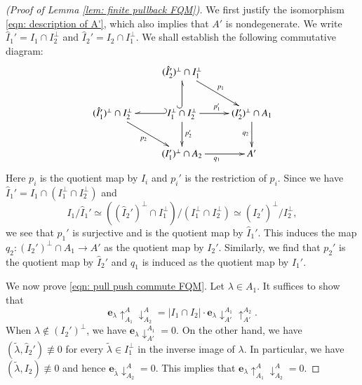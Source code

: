 \documentclass[12pt]{amsart}
\numberwithin{equation}{section}
\theoremstyle{definition}
\theoremstyle{remark}
\newcommand{\elambda}{{\mathbf e}_{\lambda}}
\begin{document}
\begin{proof}[(Proof of Lemma \ref{lem: finite pullback FQM})] 
We first justify the isomorphism \eqref{eqn: description of A'}, 
which also implies that $A'$ is nondegenerate. 
We write 
$\hat{I}_{1}'=I_{1}\cap I_{2}^{\perp}$ and  
$\hat{I}_{2}'=I_{2}\cap I_{1}^{\perp}$. 
We shall establish the following commutative diagram: 
\begin{equation*}\label{eqn: CD}
\xymatrix{
    & (\hat{I}_2')^{\perp}\cap I_{1}^{\perp} \ar[rd]^{p_1} &  \\ 
(\hat{I}_{1}')^{\perp}\cap I_{2}^{\perp} \ar[rd]_{p_2} & 
I_{1}^{\perp}\cap I_{2}^{\perp} \ar[r]^{p_1'} \ar@{^{(}-_>}[u] \ar[d]^{p_2'} \ar@{_{(}-_>}[l]
& (I_{2}')^{\perp}\cap A_{1} \ar[d]_{q_{2}}  \\ 
   & (I_{1}')^{\perp}\cap A_{2} \ar[r]_{q_1} & A' 
}
\end{equation*}
Here $p_i$ is the quotient map by $I_{i}$ and 
$p_{i}'$ is the restriction of $p_{i}$. 
Since we have 
$\hat{I}_{1}' = I_{1} \cap (I_{1}^{\perp}\cap I_{2}^{\perp})$ and 
\begin{equation*}
I_{1} / \hat{I}_{1}'  \simeq 
((\hat{I}_2')^{\perp}\cap I_{1}^{\perp}) / (I_{1}^{\perp}\cap I_{2}^{\perp}) 
\simeq (\hat{I}_{2}')^{\perp}/I_{2}^{\perp}, 
\end{equation*}
we see that $p_{1}'$ is surjective and is the quotient map by $\hat{I}_{1}'$. 
This induces the map  
$q_{2}\colon (I_2')^{\perp}\cap A_{1} \to A'$ 
as the quotient map by $I_2'$. 
Similarly, we find that 
$p_2'$ is the quotient map by $\hat{I}_{2}'$ and 
$q_{1}$ is induced as the quotient map by $I_{1}'$. 

We now prove \eqref{eqn: pull push commute FQM}. 
Let $\lambda\in A_{1}$. 
It suffices to show that 
\begin{equation}\label{eqn: pullback FQM}
{\elambda}\uparrow_{A_{1}}^{A}\downarrow^{A}_{A_{2}} = 
|I_{1}\cap I_{2}| \cdot {\elambda}\downarrow^{A_{1}}_{A'}\uparrow^{A_{2}}_{A'}. 
\end{equation}
When $\lambda\not\in (I_{2}')^{\perp}$, we have 
$\mathbf{e}_{\lambda}\! \downarrow^{A_{1}}_{A'}=0$. 
On the other hand, we have 
$(\tilde{\lambda}, \hat{I}_{2}')\not\equiv 0$ 
for every $\tilde{\lambda}\in I_{1}^{\perp}$ 
in the inverse image of $\lambda$. 
In particular, we have $(\tilde{\lambda}, I_2)\not\equiv 0$ and hence 
$\mathbf{e}_{\tilde{\lambda}}\downarrow^{A}_{A_{2}}=0$. 
This implies that  
${\elambda}\uparrow_{A_{1}}^{A}\downarrow^{A}_{A_{2}}=0$. 



\end{proof}
\end{document}
